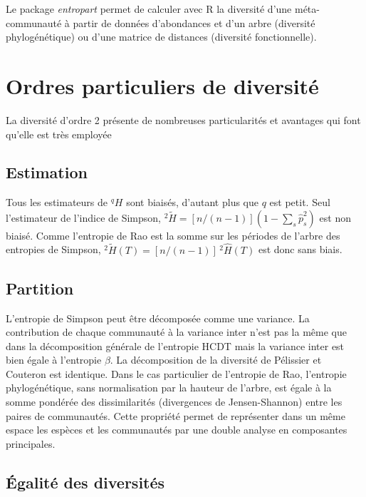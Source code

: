 \documentclass[
  11pt,
  french,
  a4paper,
  extrafontsizes,onecolumn,openright
  ]{memoir}
\begin{document}
Le package \emph{entropart}\autocite{Marcon2014c} permet de calculer avec R la diversité d'une méta-communauté à partir de données d'abondances et d'un arbre (diversité phylogénétique) ou d'une matrice de distances (diversité fonctionnelle).

\section{Ordres particuliers de diversité}\label{ordres-particuliers-de-diversituxe9}

La diversité d'ordre 2 présente de nombreuses particularités et avantages qui font qu'elle est très employée

\subsection{Estimation}\label{estimation-2}

Tous les estimateurs de \(^q\!H\) sont biaisés, d'autant plus que \(q\) est petit.
Seul l'estimateur de l'indice de Simpson, \(^{2}\!\tilde{H}=[n/(n-1)](1-\sum_s{{\hat{p}}^{2}_{s}})\) est non biaisé.
Comme l'entropie de Rao est la somme sur les périodes de l'arbre des entropies de Simpson, \(^{2}\!\tilde{H}(T)=[n/(n-1)]\,^{2}\!\hat{H}(T)\) est donc sans biais.

\subsection{Partition}\label{partition}

L'entropie de Simpson peut être décomposée comme une variance.
La contribution de chaque communauté à la variance inter n'est pas la même que dans la décomposition générale de l'entropie HCDT mais la variance inter est bien égale à l'entropie \(\beta\).
La décomposition de la diversité de Pélissier et Couteron est identique.
Dans le cas particulier de l'entropie de Rao, l'entropie phylogénétique, sans normalisation par la hauteur de l'arbre, est égale à la somme pondérée des dissimilarités (divergences de Jensen-Shannon) entre les paires de communautés.
Cette propriété permet de représenter dans un même espace les espèces et les communautés par une double analyse en composantes principales.

\subsection{Égalité des diversités}\label{uxe9galituxe9-des-diversituxe9s}
\end{document}
